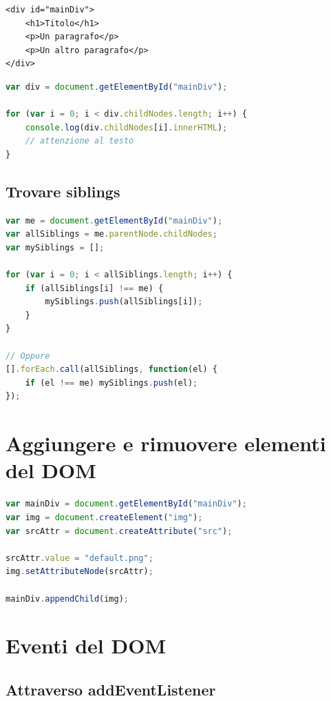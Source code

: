 \begin{lstlisting}[language=HTML5]
<div id="mainDiv">
    <h1>Titolo</h1>
    <p>Un paragrafo</p>
    <p>Un altro paragrafo</p>
</div>
\end{lstlisting}

\begin{lstlisting}[language=JavaScript]
var div = document.getElementById("mainDiv");

for (var i = 0; i < div.childNodes.length; i++) {
    console.log(div.childNodes[i].innerHTML);
    // attenzione al testo
}
\end{lstlisting}

\subsection{Trovare siblings}

\begin{lstlisting}[language=JavaScript]
var me = document.getElementById("mainDiv");
var allSiblings = me.parentNode.childNodes;
var mySiblings = [];

for (var i = 0; i < allSiblings.length; i++) {
    if (allSiblings[i] !== me) {
        mySiblings.push(allSiblings[i]);
    }
}

// Oppure
[].forEach.call(allSiblings, function(el) {
    if (el !== me) mySiblings.push(el);
});
\end{lstlisting}

\section{Aggiungere e rimuovere elementi del DOM}

\begin{lstlisting}[language=JavaScript]
var mainDiv = document.getElementById("mainDiv");
var img = document.createElement("img");
var srcAttr = document.createAttribute("src");

srcAttr.value = "default.png";
img.setAttributeNode(srcAttr);

mainDiv.appendChild(img);
\end{lstlisting}

\section{Eventi del DOM}

\subsection{Attraverso addEventListener}


